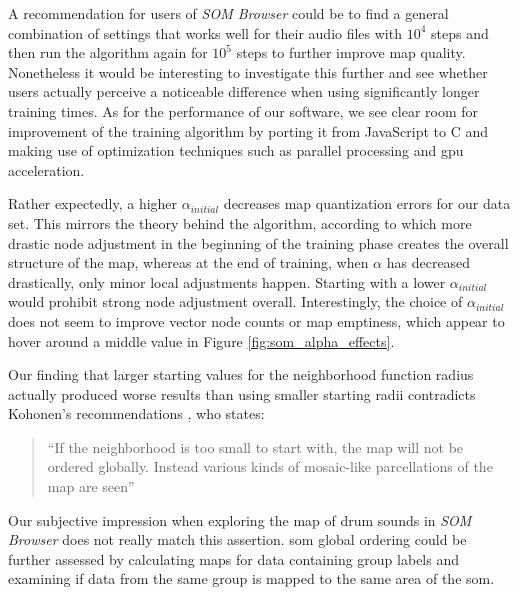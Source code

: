 A recommendation for users of \textit{SOM Browser} could be to find a general
combination of settings that works well for their audio files with $10^4$ steps
and then run the algorithm again for $10^5$ steps to further improve map
quality. Nonetheless it would be interesting to investigate this further and
see whether users actually perceive a noticeable difference when using
significantly longer training times. As for the performance of our software, we
see clear room for improvement of the training algorithm by porting it from
JavaScript to C and making use of optimization techniques such as parallel
processing and \gls{gpu} acceleration.

\smallskip

Rather expectedly, a higher $\alpha_{initial}$ decreases map quantization errors
for our data set. This mirrors the theory behind the algorithm, according to
which more drastic node adjustment in the beginning of the training phase
creates the overall structure of the map, whereas at the end of training, when
$\alpha$ has decreased drastically, only minor local adjustments happen.
Starting with a lower $\alpha_{initial}$ would prohibit strong node adjustment
overall. Interestingly, the choice of $\alpha_{initial}$ does not seem to
improve vector node counts or map emptiness, which appear to hover around a
middle value in Figure \ref{fig:som_alpha_effects}.

\smallskip

Our finding that larger starting values for the neighborhood function radius
actually produced worse results than using smaller starting radii contradicts
Kohonen's recommendations \citep{kohonen1990}, who states:

\begin{quotation}
“If the neighborhood is too small to start with, the map will not be ordered
globally. Instead various kinds of mosaic-like parcellations of the map are
seen”
\end{quotation}

Our subjective impression when exploring the map of drum sounds in
\textit{SOM Browser} does not really match this assertion. \gls{som} global
ordering could be further assessed by calculating maps for data containing group
labels and examining if data from the same group is mapped to the same area of
the \gls{som}.

\smallskip

